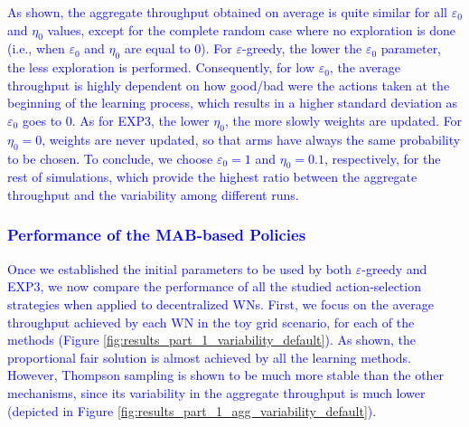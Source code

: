 \documentclass[preprint,12pt]{elsarticle}
\begin{document}
	\textcolor{blue}{As shown, the aggregate throughput obtained on average is quite similar for all $\varepsilon_0$ and $\eta_0$ values, except for the complete random case where no exploration is done (i.e., when $\varepsilon_0$ and $\eta_0$ are equal to 0). For $\varepsilon$-greedy, the lower the $\varepsilon_0$ parameter, the less exploration is performed. Consequently, for low $\varepsilon_0$, the average throughput is highly dependent on how good/bad were the actions taken at the beginning of the learning process, which results in a higher standard deviation as $\varepsilon_0$ goes to 0. As for EXP3, the lower $\eta_0$, the more slowly weights are updated. For $\eta_0 = 0$, weights are never updated, so that arms have always the same probability to be chosen. To conclude, we choose $\varepsilon_0 = 1$ and $\eta_0 = 0.1$, respectively, for the rest of simulations, which provide the highest ratio between the aggregate throughput and the variability among different runs.}
	
	\textcolor{blue}{\subsubsection{Performance of the MAB-based Policies}}
	
	\textcolor{blue}{Once we established the initial parameters to be used by both $\varepsilon$-greedy and EXP3, we now compare the performance of all the studied action-selection strategies when applied to decentralized WNs. First, we focus on the average throughput achieved by each WN in the toy grid scenario, for each of the methods (Figure \ref{fig:results_part_1_variability_default}). As shown, the proportional fair solution is almost achieved by all the learning methods. However, Thompson sampling is shown to be much more stable than the other mechanisms, since its variability in the aggregate throughput is much lower (depicted in Figure \ref{fig:results_part_1_agg_variability_default}).}
	
\end{document}
